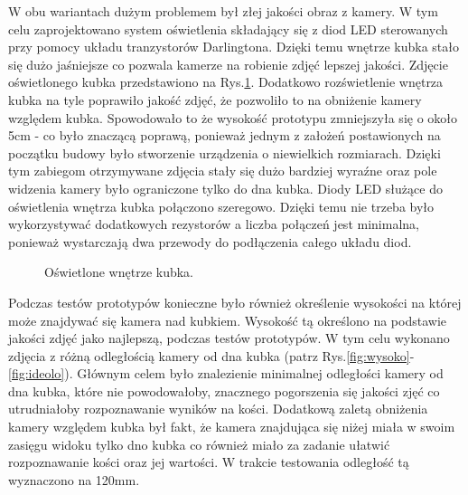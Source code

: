 W obu wariantach dużym problemem był złej jakości obraz z kamery. W tym celu zaprojektowano system oświetlenia składający się z diod
LED sterowanych przy pomocy układu tranzystorów Darlingtona. Dzięki temu wnętrze kubka stało się dużo jaśniejsze co pozwala kamerze na
robienie zdjęć lepszej jakości. Zdjęcie oświetlonego kubka przedstawiono na Rys.\ref{fig:jasno}. Dodatkowo rozświetlenie wnętrza kubka na tyle poprawiło
jakość zdjęć, że pozwoliło to na obniżenie kamery względem kubka. Spowodowało to że wysokość prototypu zmniejszyła się o około 5cm - 
co było znaczącą poprawą, ponieważ jednym z założeń postawionych na początku budowy było stworzenie urządzenia o niewielkich rozmiarach.
Dzięki tym zabiegom otrzymywane zdjęcia stały się dużo bardziej wyraźne oraz pole widzenia kamery było ograniczone tylko do dna kubka.
Diody LED służące do oświetlenia wnętrza kubka połączono szeregowo. Dzięki temu nie trzeba było wykorzystywać dodatkowych rezystorów a liczba połączeń
jest minimalna, ponieważ wystarczają dwa przewody do podłączenia całego układu diod.

\begin{figure}[H]
    \centering
    \caption{\label{fig:jasno}Oświetlone wnętrze kubka.}
\end{figure}

Podczas testów prototypów konieczne było również określenie wysokości na której może znajdywać się kamera nad kubkiem. Wysokość tą określono na podstawie 
jakości zdjęć jako najlepszą, podczas testów prototypów. W tym celu wykonano zdjęcia z różną odległością kamery od dna kubka (patrz Rys.\ref{fig:wysoko}-\ref{fig:ideolo}). Głównym celem było znalezienie minimalnej odległości kamery od dna kubka, które nie powodowałoby, 
znacznego pogorszenia się jakości zjęć co utrudniałoby rozpoznawanie wyników na kości. Dodatkową zaletą obniżenia kamery względem kubka był fakt, że kamera 
znajdująca się niżej miała w swoim zasięgu widoku tylko dno kubka co również miało za zadanie ułatwić rozpoznawanie kości oraz jej wartości. W trakcie testowania
odległość tą wyznaczono na 120mm.

